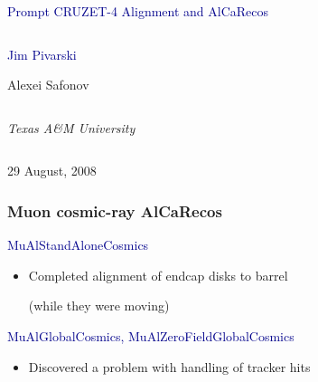 \documentclass[compress]{beamer}
\begin{document}
\begin{frame}
\vfill
\begin{center}
\textcolor{darkblue}{\Large Prompt CRUZET-4 Alignment and AlCaRecos}

\vfill
\begin{columns}
\begin{center}
\textcolor{darkblue}{\large Jim Pivarski}

\vspace{0.2 cm}
Alexei Safonov
\end{center}
\end{columns}

\begin{columns}
\begin{center}
\scriptsize
{\it Texas A\&M University}
\end{center}
\end{columns}

\vfill
29 August, 2008

\end{center}
\end{frame}


\begin{frame}
\frametitle{Muon cosmic-ray AlCaRecos}
\textcolor{darkblue}{MuAlStandAloneCosmics}

\vspace{0.2 cm}
\begin{itemize}
\item Completed alignment of endcap disks to barrel

(while they were moving)
\end{itemize}

\vfill
\textcolor{darkblue}{MuAlGlobalCosmics, MuAlZeroFieldGlobalCosmics}

\vspace{0.2 cm}
\begin{itemize}
\item Discovered a problem with handling of tracker hits
\end{itemize}
\end{frame}
\end{document}

